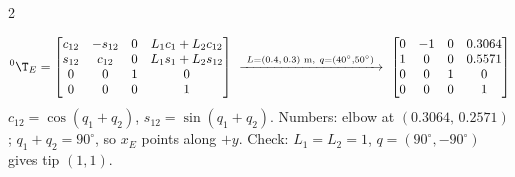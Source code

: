 \begin{multicols}{2}
\begin{worked}
\begin{minipage}[c]{0.55\linewidth}
\end{minipage}
\[{}^0\T_E=\begin{bmatrix}c_{12}&-s_{12}&0&L_1c_1+L_2c_{12}\\s_{12}&c_{12}&0&L_1s_1+L_2s_{12}\\0&0&1&0\\0&0&0&1\end{bmatrix}\ \xrightarrow{\ L=(0.4,\,0.3)\text{ m},\ q=(40^\circ,50^\circ)\ }\ \begin{bmatrix}0&-1&0&0.3064\\1&0&0&0.5571\\0&0&1&0\\0&0&0&1\end{bmatrix}\]
$c_{12}=\cos(q_1+q_2)$, $s_{12}=\sin(q_1+q_2)$. Numbers: elbow at $(0.3064,\,0.2571)$; $q_1{+}q_2=90^\circ$, so $x_E$ points along $+y$. Check: $L_1=L_2=1$, $q=(90^\circ,-90^\circ)$ gives tip $(1,1)$. \chk
\end{worked}


\end{multicols}
